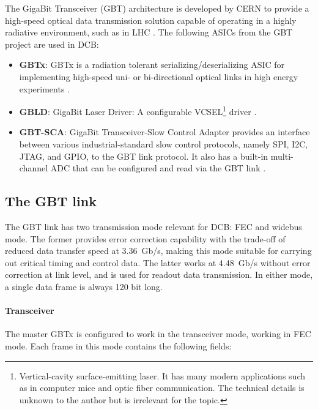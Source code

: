 The GigaBit Transceiver (GBT) architecture is developed by CERN to provide a
high-speed optical data transmission solution capable of operating in a
highly radiative environment, such as in LHC \cite{P_Moreira_2010}.
The following ASICs from the GBT project are used in DCB:

\begin{itemize}
    \item \textbf{GBTx}:
        GBTx is a radiation tolerant serializing/deserializing ASIC for
        implementing high-speed uni- or bi-directional optical links in high
        energy experiments
        \cite{gbtx_manual}.

    \item \textbf{GBLD}:
        GigaBit Laser Driver:
        A configurable VCSEL\footnote{
            Vertical-cavity surface-emitting laser.
            It has many modern applications such as in computer mice and optic
            fiber communication.
            The technical details is unknown to the author but is irrelevant
            for the topic.
        } driver
        \cite{gbld_manual}.

    \item \textbf{GBT-SCA}:
        GigaBit Transceiver-Slow Control Adapter provides an interface between
        various industrial-standard slow control protocols,
        namely SPI, I2C, JTAG, and GPIO, to the GBT link protocol.
        It also has a built-in multi-channel ADC that can be configured and
        read via the GBT link \cite{sca_manual}.
\end{itemize}


\subsection{The GBT link}
\label{dcb-gbt-link}

The GBT link has two transmission mode relevant for DCB: FEC and widebus mode.
The former provides error correction capability with the trade-off of reduced
data transfer speed at 3.36~Gb/s,
making this mode suitable for carrying out critical timing and control data.
The latter works at 4.48~Gb/s without error correction at link level,
and is used for readout data transmission.
In either mode, a single data frame is always 120 bit long.

\paragraph{Transceiver}
The master GBTx is configured to work in the transceiver mode, working in
FEC mode.
Each frame in this mode contains the following fields:


